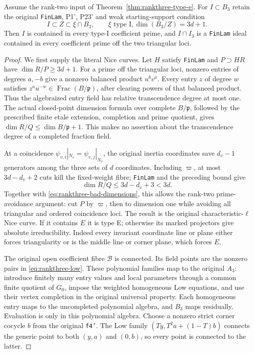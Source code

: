 \begin{theorem}
\label{thm:rankthree-normalized-propagation}
Assume the rank-two input of Theorem~\ref{thm:rankthree-type-e}.
For $I\subset B_3$ retain the original \texttt{FinLam}, P1', P23'
and weak starting-support condition
\begin{equation}\label{eq:rankthree-weak-seed}
 I\subset Z\subset\xi\cap B_3,\qquad \xi\text{ type I},
                    \dim(B_3/Z)=3d+1.
\end{equation}
Then $I$ is contained in every type-I coefficient prime, and
$I\cap I_3$ is a \texttt{FinLam} ideal contained in every
coefficient prime off the two triangular loci.
\end{theorem}
\begin{proof}
We first supply the literal Nice curves.  Let $H$ satisfy
\texttt{FinLam} and $P\supset HR$ have $\dim R/P\ge3d+1$.
For a prime off the triangular loci, nonzero entries of degrees
$a,-b$ give a nonzero balanced product $u^bv^a$.  Every entry $z$
of degree $w$ satisfies $z^au^{-w}\in\operatorname{Frac}(B/\mathfrak p)$,
after clearing powers of that balanced product.  Thus the algebraized
entry field has relative transcendence degree at most one.
The actual closed-point dimension formula over complete $B/\mathfrak p$,
followed by the prescribed finite etale extension, completion and
prime quotient, gives $\dim R/Q\le\dim B/\mathfrak p+1$.
This makes no assertion about the transcendence degree of a completed
fraction field.

At a coincidence $\psi_{v,i}|_{N_v}=\psi_{v,j}|_{N_v}$, the original
inertia coordinates save $d_v-1$ generators among the three sets
of $d$ coordinates.  Including $\varpi$, at most $3d-d_v+2$
cuts kill the fixed-weight fibre; \texttt{FinLam} and the preceding
bound give
\[
                         \dim R/Q\le3d-d_v+3<3d.
\]
Together with \eqref{eq:rankthree-bad-dimensions}, this allows the
rank-two prime-avoidance argument: cut $P$ by $\varpi$, then to
dimension one while avoiding all triangular and ordered coincidence
loci.  The result is the original characteristic-$\ell$ Nice curve.
If it contains $E$ it is type E; otherwise its marked projectors
give absolute irreducibility.  Indeed every invariant coordinate
line or plane either forces triangularity or is the middle line
or corner plane, which forces $E$.

The original open coefficient fibre $\mathcal B$ is connected.
Its field points are the nonzero pairs in
\eqref{eq:rankthree-low}.  These polynomial families map to the
original $A_3$: introduce finitely many entry values and local
parameters through a common finite quotient of $G_0$, impose the
weighted homogeneous Low equations, and use their vertex completion
in the original universal property.  Each homogeneous entry maps
to the uncompleted polynomial algebra, and $B_3$ maps residually.
Evaluation is only in this polynomial algebra.
Choose a nonzero strict corner cocycle $b$ from the original
\texttt{f4'}.  The Low family
$(Ty,T^2a+(1-T)b)$ connects the generic point to both $(y,a)$
and $(0,b)$, so every point is connected to the latter.


\end{proof}
